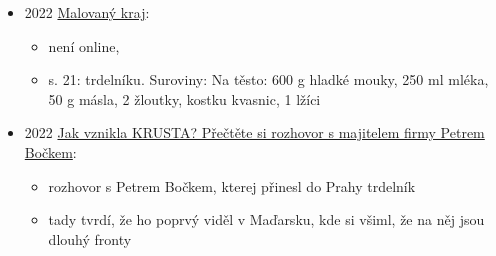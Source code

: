 \begin{itemize}
\begin{itemize}
    \begin{itemize}
    \tightlist
    \item
      pruhy pečený na válci, krájený na kroužky
    \item
      na Horňácku se před upečením uhlazoval, aby se nerozpadal do
      spirály, pocukrovanej se krájel na krůžalce
    \item
      modernější varianta se pekla v troubě, ale někde se i smažila, pak
      se plnila bílkovým sněhem nebo šlehačkou, připomínaly kremrole
      nebo šamrole
    \end{itemize}
  \item
    na Zlínsku a Mikulovsku:

    \begin{itemize}
    \tightlist
    \item
      v německým prostředí se nazývaly Prügelkrapfen nebo Ringelkrapfen,
      rožnily se na trdle, označovaným taky jako pryglík
    \item
      podobně jako jinde se postupně zmenšily do podoby trubiček
    \item
      na Znojemsku a možná i Jihlavsku se v německých obcích dělal i
      litej trdelník, jak je známej z Rakouska, po vysídlení Němců byly
      zapomenutý
    \end{itemize}
  \end{itemize}
\item
  2022
  \href{https://ndk.cz/uuid/uuid:8bfe5d60-4298-11ef-81c2-5ef3fc9bb22f}{Malovaný
  kraj}:

  \begin{itemize}
  \tightlist
  \item
    není online, 
  \item
    s. 21: trdelníku. Suroviny: Na těsto: 600 g hladké mouky, 250 ml
    mléka, 50 g másla, 2 žloutky, kostku kvasnic, 1 lžíci
  \end{itemize}
\item
  2022 \href{https://pekarnakrusta.cz/jak-vznikla-krusta/}{Jak vznikla
  KRUSTA? Přečtěte si rozhovor s majitelem firmy Petrem Bočkem}:

  \begin{itemize}
  \tightlist
  \item
    rozhovor s Petrem Bočkem, kterej přinesl do Prahy trdelník
  \item
    tady tvrdí, že ho poprvý viděl v Maďarsku, kde si všiml, že na něj
    jsou dlouhý fronty


\end{itemize}
\end{itemize}
